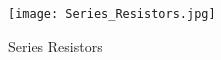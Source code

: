 \documentclass[landscape]{article}
\begin{document}
\begin{figure}[h t b]
	\centering
	\texttt{[image: Series\_Resistors.jpg]}
	\caption{Series Resistors}
	\label{fig: Series_Resistors}
\end{figure}
\end{document}
